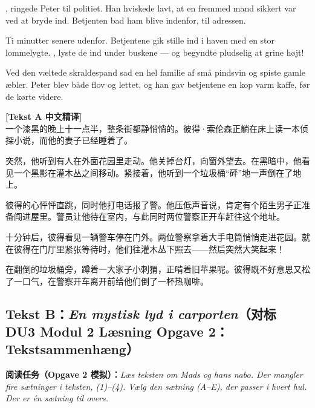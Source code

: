 , ringede Peter til politiet. Han hviskede lavt, at en fremmed mand sikkert var ved at bryde ind. Betjenten bad ham blive indenfor,  til adressen.

Ti minutter senere  udenfor. Betjentene gik stille ind i haven med en stor lommelygte. , lyste de ind under buskene --- og begyndte pludselig at grine højt!

Ved den væltede skraldespand sad en hel familie af små pindsvin og spiste gamle æbler. Peter blev både flov og lettet, og han gav betjentene en kop varm kaffe, før de kørte videre.

\begin{transbox}
\small
\textbf{\color{NCDTeal}[Tekst A 中文精译]}\\
一个漆黑的晚上十一点半，整条街都静悄悄的。彼得·索伦森正躺在床上读一本侦探小说，而他的妻子已经睡着了。

突然，他听到有人在外面花园里走动。他关掉台灯，向窗外望去。在黑暗中，他看见一个黑影在灌木丛之间移动。紧接着，他听到一个垃圾桶“砰”地一声倒在了地上。

彼得的心怦怦直跳，同时他打电话报了警。他压低声音说，肯定有个陌生男子正准备闯进屋里。警员让他待在室内，与此同时两位警察正开车赶往这个地址。

十分钟后，彼得看见一辆警车停在门外。两位警察拿着大手电筒悄悄走进花园。就在彼得在门厅里紧张等待时，他们往灌木丛下照去——然后突然大笑起来！

在翻倒的垃圾桶旁，蹲着一大家子小刺猬，正啃着旧苹果呢。彼得既不好意思又松了一口气，在警察开车离开前给他们倒了一杯热咖啡。
\end{transbox}

\subsection*{Tekst B：\textit{En mystisk lyd i carporten}（对标 DU3 Modul 2 Læsning Opgave 2：Tekstsammenhæng）}

\textbf{阅读任务（Opgave 2 模拟）：}\textit{Læs teksten om Mads og hans nabo. Der mangler fire sætninger i teksten, (1)--(4). Vælg den sætning (A--E), der passer i hvert hul. Der er én sætning til overs.}

